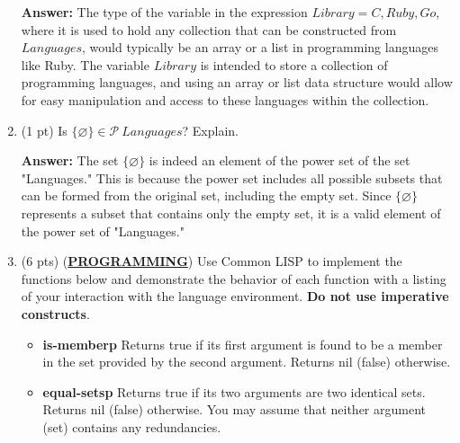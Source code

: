 \documentclass[12pt]{article}
\begin{document}
\begin{spacing}{1.5}
\begin{enumerate}
		      \textbf{Answer:} The type of the variable in the expression $Library = {C, Ruby, Go}$, where it is used to hold any collection that can be constructed from $Languages$, would typically be an array or a list in programming languages like Ruby. The variable $Library$ is intended to store a collection of programming languages, and using an array or list data structure would allow for easy manipulation and access to these languages within the collection.\\
		      		      		      		                  
		\item (1 pt) Is $\{\varnothing\} \in \mathcal{P} \: Languages$? Explain.
		      		      		      		      
		      \textbf{Answer:} The set $\{\varnothing\}$ is indeed an element of the power set of the set "Languages." This is because the power set includes all possible subsets that can be formed from the original set, including the empty set. Since $\{\varnothing\}$ represents a subset that contains only the empty set, it is a valid element of the power set of "Languages."\\
		      		      		      		                  
		\item (6 pts) (\textbf{\uline{{PROGRAMMING}}}) Use Common LISP to implement the functions below and demonstrate the behavior of each function with a listing of your interaction with the language environment. \textbf{Do not use imperative constructs}.
		      		      		      		      
		      \begin{itemize}
		      	\item \textbf{is-memberp} Returns true if its first argument is found to be a member in the set provided by the second argument. Returns nil (false) otherwise.

                    
		      	      		      	      		      	      		      	                      
		      	\item \textbf{equal-setsp} Returns true if its two arguments are two identical sets. Returns nil (false) otherwise. You may assume that neither argument (set) contains any redundancies.

                    
		      	      		      	      		      	      		      	                      

\end{itemize}
\end{enumerate}
\end{spacing}
\end{document}
